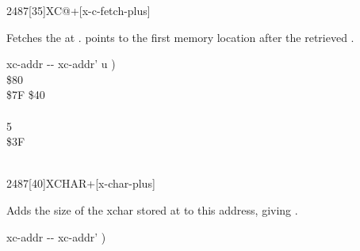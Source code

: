 \vspace*{-1ex}
\begin{worddef}{2487}[35]{XC@+}[x-c-fetch-plus]%
\item {}

	Fetches the  at .  
	points to the first memory location after the retrieved .
	
	\begin{implement} %
	\word{:}   xc-addr -{}- xc-addr' u ) \\
	\tab {}  \$80        \\
	\tab \$7F  \$40  \\
	\tab {}       \\
	   5     \\
	\tab[2] \$3F    \\
	\tab {}   \\
	\word{;}
	\end{implement}

%
\end{worddef}

\vspace*{-1ex}
\begin{worddef}{2487}[40]{XCHAR+}[x-char-plus]%
\item {}

	Adds the size of the xchar stored at  to this address,
	giving .


	\begin{implement} %
	\word{:}   xc-addr -{}- xc-addr' )    \word{;}
	\end{implement}
\end{worddef}


